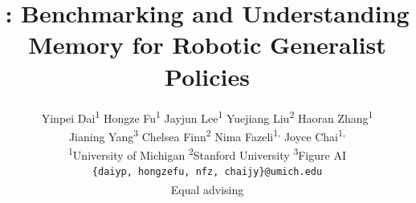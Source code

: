 \documentclass[10pt,twocolumn,letterpaper]{article}
\title{\benchname: Benchmarking and Understanding Memory for Robotic Generalist Policies}
\author{
Yinpei Dai\textsuperscript{1} \quad Hongze Fu\textsuperscript{1} \quad Jayjun Lee\textsuperscript{1} \quad Yuejiang Liu\textsuperscript{2} \quad Haoran Zhang\textsuperscript{1}\\
Jianing Yang\textsuperscript{3} \quad Chelsea Finn\textsuperscript{2} \quad Nima Fazeli\textsuperscript{1,\textdagger} \quad Joyce Chai\textsuperscript{1,\textdagger}\\[2pt]
\textsuperscript{1}University of Michigan \quad \textsuperscript{2}Stanford University \quad \textsuperscript{3}Figure AI\\
{\tt\small \{daiyp, hongzefu, nfz, chaijy\}@umich.edu}\\
\textsuperscript{\textdagger}Equal advising
}
\begin{document}
\maketitle









{
    \small
    
    
}

% 
\end{document}
